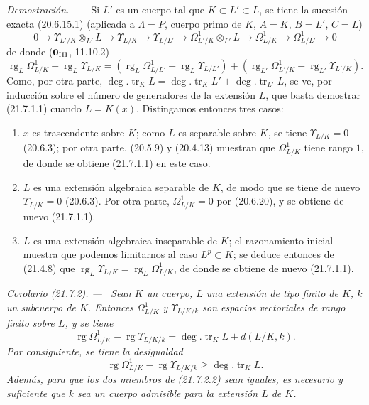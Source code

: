 \documentclass[10pt,oneside]{book}
\makeatletter
\newcommand{\setmanualcurrentlabel}[1]{\def\@currentlabel{#1}}
\newenvironment{corollary}[1][]{%
  \setmanualcurrentlabel{#1}\par\medskip\noindent\itshape Corolario (#1). ---\ }{\par}
\newenvironment{proof}{%
  \par\medskip\noindent\textit{Demostración. ---\ }}{\par}
\providecommand{\setmin}{-}%
\makeatother
\begin{document}
\begin{proof}
Si $L'$ es un cuerpo tal que $K\subset L'\subset L$, se tiene la sucesión exacta
(20.6.15.1) (aplicada a $\Lambda=P$, cuerpo primo de $K$, $A=K$,
$B=L'$, $C=L$)
\[
0\to\Upsilon_{L'/K}\otimes_{L'}L\to\Upsilon_{L/K}\to\Upsilon_{L/L'}
\to\Omega^1_{L'/K}\otimes_{L'}L\to\Omega^1_{L/K}
\to\Omega^1_{L/L'}\to0
\]
de donde ($\mathbf{0}_{\rm III}$, 11.10.2)
\[
\operatorname{rg}_L\Omega^1_{L/K}\setmin\operatorname{rg}_L\Upsilon_{L/K}
=(\operatorname{rg}_L\Omega^1_{L/L'}\setmin\operatorname{rg}_L\Upsilon_{L/L'})
+(\operatorname{rg}_{L'}\Omega^1_{L'/K}\setmin\operatorname{rg}_{L'}\Upsilon_{L'/K}).
\]
Como, por otra parte, $\deg.\operatorname{tr}_K L=\deg.\operatorname{tr}_K L'
+\deg.\operatorname{tr}_{L'}L$, se ve, por inducción sobre el número de
generadores de la extensión $L$, que basta demostrar (21.7.1.1) cuando
$L=K(x)$. Distingamos entonces tres casos:
\begin{enumerate}
  \item[\textit{a)}] $x$ es trascendente sobre $K$; como $L$ es separable sobre
  $K$, se tiene $\Upsilon_{L/K}=0$ (20.6.3); por otra parte, (20.5.9) y
  (20.4.13) muestran que $\Omega^1_{L/K}$ tiene rango $1$, de donde se
  obtiene (21.7.1.1) en este caso.
  \item[\textit{b)}] $L$ es una extensión algebraica separable de $K$, de modo que
  se tiene de nuevo $\Upsilon_{L/K}=0$ (20.6.3). Por otra parte,
  $\Omega^1_{L/K}=0$ por (20.6.20), y se obtiene de nuevo (21.7.1.1).
  \item[\textit{c)}] $L$ es una extensión algebraica inseparable de $K$; el
  razonamiento inicial muestra que podemos limitarnos al caso $L^p\subset K$;
  se deduce entonces de (21.4.8) que
  $\operatorname{rg}_L\Upsilon_{L/K}=\operatorname{rg}_L\Omega^1_{L/K}$,
  de donde se obtiene de nuevo (21.7.1.1).
\end{enumerate}
\end{proof}

\begin{corollary}[21.7.2]
\label{0.21.7.2-es}
Sean $K$ un cuerpo, $L$ una extensión de tipo finito de $K$, $k$ un subcuerpo
de $K$. Entonces $\Omega^1_{L/K}$ y $\Upsilon_{L/K/k}$ son espacios
vectoriales de rango finito sobre $L$, y se tiene
\begin{equation}
\tag{21.7.2.1}
\label{0.21.7.2.1-es}
\operatorname{rg}\Omega^1_{L/K}\setmin\operatorname{rg}\Upsilon_{L/K/k}
=\deg.\operatorname{tr}_K L+d(L/K,k).
\end{equation}
Por consiguiente, se tiene la desigualdad
\begin{equation}
\tag{21.7.2.2}
\label{0.21.7.2.2-es}
\operatorname{rg}\Omega^1_{L/K}\setmin\operatorname{rg}\Upsilon_{L/K/k}
\geqslant\deg.\operatorname{tr}_K L.
\end{equation}
Además, para que los dos miembros de \textup{(21.7.2.2)} sean iguales, es necesario y
suficiente que $k$ sea un cuerpo admisible para la extensión $L$ de $K$.
\end{corollary}
\end{document}

